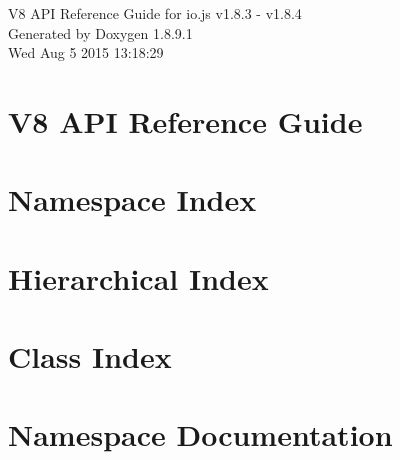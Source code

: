 \documentclass[twoside]{book}
\newcommand{\+}{\discretionary{\mbox{\scriptsize$\hookleftarrow$}}{}{}}
\newcommand{\clearemptydoublepage}{%
  \newpage{\pagestyle{empty}\cleardoublepage}%
}
\begin{document}
\hypersetup{pageanchor=false,
             bookmarks=true,
             bookmarksnumbered=true,
             pdfencoding=unicode
            }
\begin{titlepage}
\vspace*{7cm}
\begin{center}%
{\Large V8 A\+P\+I Reference Guide for io.\+js v1.8.3 -\/ v1.8.4 }\\
\vspace*{1cm}
{\large Generated by Doxygen 1.8.9.1}\\
\vspace*{0.5cm}
{\small Wed Aug 5 2015 13:18:29}\\
\end{center}
\end{titlepage}
\clearemptydoublepage
\tableofcontents
\clearemptydoublepage
{}
\hypersetup{pageanchor=true}

\chapter{V8 A\+P\+I Reference Guide}
\label{index}\hypertarget{index}{}
\chapter{Namespace Index}

\chapter{Hierarchical Index}

\chapter{Class Index}

\chapter{Namespace Documentation}

\end{document}
